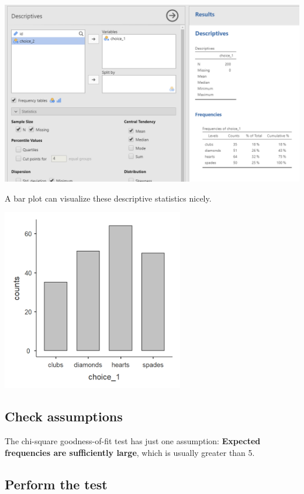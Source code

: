 \documentclass[
]{book}
\begin{document}
\includegraphics{images/09-chi-square/chi-square_descriptives.png}

A bar plot can visualize these descriptive statistics nicely.

\includegraphics[width=3.125in,height=\textheight]{images/09-chi-square/chi-square_bar.png}

\hypertarget{check-assumptions-3}{%
\subsection{Check assumptions}\label{check-assumptions-3}}

The chi-square goodness-of-fit test has just one assumption: \textbf{Expected frequencies are sufficiently large}, which is usually greater than 5.

\hypertarget{perform-the-test-3}{%
\subsection{Perform the test}\label{perform-the-test-3}}
\end{document}

